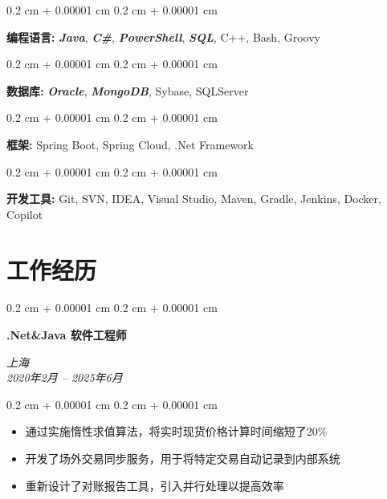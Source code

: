 \documentclass[10pt, letterpaper]{article}
\newenvironment{highlights}{
	\begin{itemize}[
		topsep=0.10 cm,
		parsep=0.10 cm,
		partopsep=0pt,
		itemsep=0pt,
		leftmargin=0.4 cm + 10pt
		]
	}{
	\end{itemize}
} %
\newenvironment{onecolentry}{
	\begin{adjustwidth}{
			0.2 cm + 0.00001 cm
		}{
			0.2 cm + 0.00001 cm
		}
	}{
	\end{adjustwidth}
} %
\newenvironment{twocolentry}[2][]{
	\onecolentry
	\def\secondColumn{#2}
	\setcolumnwidth{\fill, 4.5 cm}
	\begin{paracol}{2}
	}{
		\switchcolumn \raggedleft \secondColumn
	\end{paracol}
	\endonecolentry
} %
\begin{document}
		\begin{onecolentry}
			\textbf{编程语言:} \emph{\textbf{Java}}, \emph{\textbf{C\#}}, \emph{\textbf{PowerShell}}, \emph{\textbf{SQL}}, C++, Bash, Groovy
		\end{onecolentry}
		
		\vspace{0.1 cm}
		
		\begin{onecolentry}
			\textbf{数据库:} \emph{\textbf{Oracle}}, \emph{\textbf{MongoDB}}, Sybase,  SQLServer
		\end{onecolentry}
		
		\vspace{0.1 cm}
		
		\begin{onecolentry}
			\textbf{框架:} Spring Boot, Spring Cloud, .Net Framework
		\end{onecolentry}
		
		\vspace{0.1 cm}
		
		\begin{onecolentry}
			\textbf{开发工具:} Git, SVN, IDEA, Visual Studio, Maven, Gradle, Jenkins, Docker, Copilot
		\end{onecolentry}
	
	
	
	
	\section{工作经历}
	\vspace{0.1 cm}
	
	\begin{twocolentry}{
		\textit{上海} \\
		\textit{2020年2月 – 2025年6月}}
		\textbf{.Net\&Java 软件工程师}
		\\
	\end{twocolentry}
	
	\vspace{0.08 cm}
	\begin{onecolentry}
		\begin{highlights}
			\item{通过实施惰性求值算法，将实时现货价格计算时间缩短了20\%}
			\item{开发了场外交易同步服务，用于将特定交易自动记录到内部系统}
			\item{重新设计了对账报告工具，引入并行处理以提高效率}
		\end{highlights}
	\end{onecolentry}
	
\end{document}
